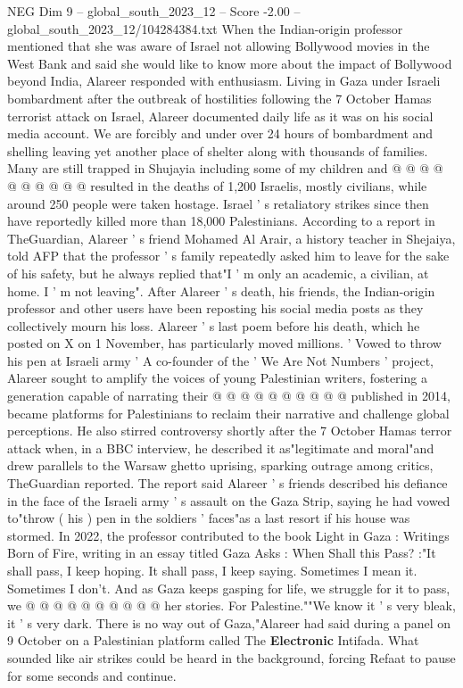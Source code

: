 \begin{textsample}{NEG Dim 9 – global\_south\_2023\_12 – Score -2.00 – global\_south\_2023\_12/104284384.txt}
When the Indian-origin professor mentioned that she was aware of Israel not allowing Bollywood movies in the West Bank and said she would like to know more about the impact of Bollywood beyond India, Alareer responded with enthusiasm.
Living in Gaza under Israeli bombardment after the outbreak of hostilities following the 7 October Hamas terrorist attack on Israel, Alareer documented daily life as it was on his social media account.
We are forcibly and under over 24 hours of bombardment and shelling leaving yet another place of shelter along with thousands of families.
Many are still trapped in Shujayia including some of my children and @ @ @ @ @ @ @ @ @ @ resulted in the deaths of 1,200 Israelis, mostly civilians, while around 250 people were taken hostage.
Israel ' s retaliatory strikes since then have reportedly killed more than 18,000 Palestinians.
According to a report in TheGuardian, Alareer ' s friend Mohamed Al Arair, a history teacher in Shejaiya, told AFP that the professor ' s family repeatedly asked him to leave for the sake of his safety, but he always replied that"I ' m only an academic, a civilian, at home.
I ' m not leaving".
After Alareer ' s death, his friends, the Indian-origin professor and other users have been reposting his social media posts as they collectively mourn his loss.
Alareer ' s last poem before his death, which he posted on X on 1 November, has particularly moved millions. ' Vowed to throw his pen at Israeli army ' A co-founder of the ' We Are Not Numbers ' project, Alareer sought to amplify the voices of young Palestinian writers, fostering a generation capable of narrating their @ @ @ @ @ @ @ @ @ @ published in 2014, became platforms for Palestinians to reclaim their narrative and challenge global perceptions.
He also stirred controversy shortly after the 7 October Hamas terror attack when, in a BBC interview, he described it as"legitimate and moral"and drew parallels to the Warsaw ghetto uprising, sparking outrage among critics, TheGuardian reported.
The report said Alareer ' s friends described his defiance in the face of the Israeli army ' s assault on the Gaza Strip, saying he had vowed to"throw ( his ) pen in the soldiers ' faces"as a last resort if his house was stormed.
In 2022, the professor contributed to the book Light in Gaza : Writings Born of Fire, writing in an essay titled Gaza Asks : When Shall this Pass? :"It shall pass, I keep hoping.
It shall pass, I keep saying.
Sometimes I mean it.
Sometimes I don't.
And as Gaza keeps gasping for life, we struggle for it to pass, we @ @ @ @ @ @ @ @ @ @ her stories.
For Palestine.""We know it ' s very bleak, it ' s very dark.
There is no way out of Gaza,"Alareer had said during a panel on 9 October on a Palestinian platform called The \textbf{Electronic} Intifada.
What sounded like air strikes could be heard in the background, forcing Refaat to pause for some seconds and continue.

\end{textsample}
